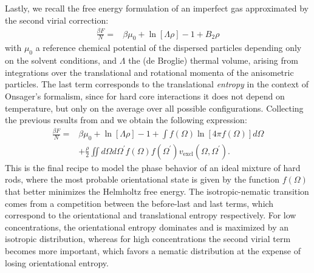 Lastly, we recall the free energy formulation of an imperfect gas approximated by the second virial correction:
\begin{align}
\frac{\beta F}{N} =& \beta \mu_{0}+\ln\left[\Lambda\rho\right]-1+ B_2 \rho
\end{align}
with $\mu_{0}$ a reference chemical potential of the dispersed particles depending only on the solvent conditions, and $\Lambda$ the (de Broglie) thermal volume, arising from
integrations over the translational and rotational momenta of the anisometric particles. The last term corresponds to the translational {\em entropy} in the context of Onsager's formalism, since for hard core interactions it does not depend on temperature, but only on the average over all possible configurations. Collecting the previous results from  and  we obtain the following expression:
\begin{align}
\frac{\beta F}{N} =& \beta \mu_{0}+\ln\left[\Lambda\rho\right]-1+
\int f(\Omega)\ln \left[4\pi f(\Omega)\right]d\Omega \nonumber \\
&+\frac{\rho}{2} \iint d\Omega d\Omega^{\prime}
f(\Omega)f(\Omega^{\prime})v_{\text{excl}}(\Omega,\Omega^{\prime}). \label{0freetot}
\end{align}
This is the final recipe to model the phase behavior of an ideal mixture of hard rods, where the most probable orientational state is given by the function $f(\Omega)$ that better minimizes the Helmholtz free energy. The isotropic-nematic transition comes from a competition between the before-last and last terms, which correspond to the orientational and translational entropy respectively. For low concentrations, the orientational entropy dominates and is maximized by an isotropic distribution, whereas for high concentrations the second virial term becomes more important, which favors a nematic distribution at the expense of losing orientational entropy.

